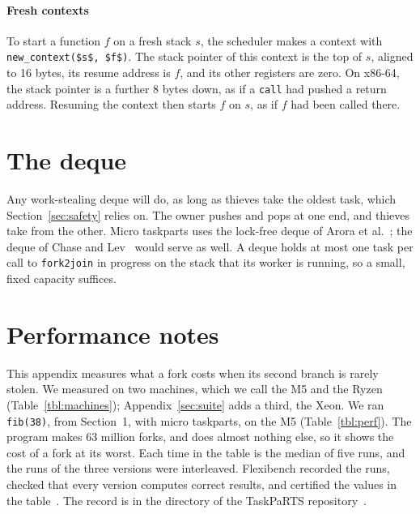 \documentclass[sigplan,nonacm]{acmart}
\begin{document}
\paragraph{Fresh contexts}
%
To start a function $f$ on a fresh stack $s$, the scheduler makes a
context with \lstinline|new_context($s$, $f$)|.
%
The stack pointer of this context is the top of $s$, aligned to 16
bytes, its resume address is $f$, and its other registers are zero.
%
On x86-64, the stack pointer is a further 8 bytes down, as if a
\lstinline|call| had pushed a return address.
%
Resuming the context then starts $f$ on $s$, as if $f$ had been called
there.

\section{The deque}
\label{sec:deque}

Any work-stealing deque will do, as long as thieves take the oldest
task, which Section~\ref{sec:safety} relies on.
%
The owner pushes and pops at one end, and thieves take from the other.
%
Micro taskparts uses the lock-free deque of Arora et
al.~\cite{arora98}; the deque of Chase and Lev~\cite{chasele05} would
serve as well.
%
A deque holds at most one task per call to \lstinline|fork2join| in
progress on the stack that its worker is running, so a small, fixed
capacity suffices.

\section{Performance notes}
\label{sec:perf}

This appendix measures what a fork costs when its second branch is
rarely stolen.
%
We measured on two machines, which we call the M5 and the Ryzen
(Table~\ref{tbl:machines}); Appendix~\ref{sec:suite} adds a third, the
Xeon.
%
We ran \lstinline|fib(38)|, from Section~1, with micro taskparts, on
the M5 (Table~\ref{tbl:perf}).
%
The program makes 63 million forks, and does almost nothing else, so
it shows the cost of a fork at its worst.
%
Each time in the table is the median of five runs, and the runs of the
three versions were interleaved.
%
Flexibench recorded the runs, checked that every version computes
correct results, and certified the values in the
table~\cite{flexibench-times}.
%
The record is in the directory  of the
TaskPaRTS repository~\cite{taskparts}.
\end{document}
